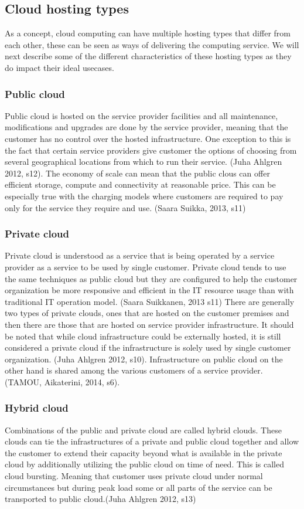\documentclass{article}
\begin{document}
\subsection{Cloud hosting types}
As a concept, cloud computing can have multiple hosting types that differ from each other, these can be seen as ways of delivering the computing service. We will next describe some of the different characteristics of these hosting types as they do impact their ideal usecases.
\subsubsection{Public cloud}
Public cloud is hosted on the service provider facilities and all maintenance, modifications and upgrades are done by the service provider, meaning that the customer has no control over the hosted infrastructure. One exception to this is the fact that certain service providers give customer the options of choosing from several geographical locations from which to run their service. (Juha Ahlgren 2012, s12).
The economy of scale can mean that the public clous can offer efficient storage, compute and connectivity at reasonable price. This can be especially true with the charging models where customers are required to pay only for the service they require and use. (Saara Suikka, 2013, s11)
\subsubsection{Private cloud}
Private cloud is understood as a service that is being operated by a service provider as a service to be used by single customer. Private cloud tends to use the same techniques as public cloud but they are configured to help the customer organization be more responsive and efficient in the IT resource usage than with traditional IT operation model. (Saara Suikkanen, 2013 s11)
There are generally two types of private clouds, ones that are hosted on the customer premises and then there are those that are hosted on service provider infrastructure. It should be noted that while cloud infrastructure could be externally hosted, it is still considered a private cloud if the infrastructure is solely used by single customer organization. (Juha Ahlgren 2012, s10).
Infrastructure on public cloud on the other hand is shared among the various customers of a service provider. (TAMOU, Aikaterini, 2014, s6).
\subsubsection{Hybrid cloud}
Combinations of the public and private cloud are called hybrid clouds. These clouds can tie the infrastructures of a private and public cloud together and allow the customer to extend their capacity beyond what is available in the private cloud by additionally utilizing the public cloud on time of need. This is called cloud bursting. Meaning that customer uses private cloud under normal circumstances but during peak load some or all parts of the service can be transported to public cloud.(Juha Ahlgren 2012, s13)
\end{document}
